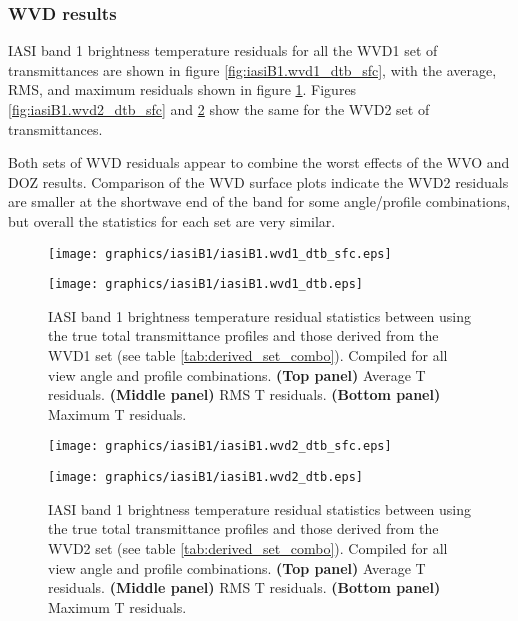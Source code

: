 \subsubsection{WVD results}
IASI band 1 brightness temperature residuals for all the WVD1 set of transmittances are shown in figure \ref{fig:iasiB1.wvd1_dtb_sfc}, with the average, RMS, and maximum residuals shown in figure \ref{fig:iasiB1.wvd1_dtb}. Figures \ref{fig:iasiB1.wvd2_dtb_sfc} and \ref{fig:iasiB1.wvd2_dtb} show the same for the WVD2 set of transmittances.

Both sets of WVD residuals appear to combine the worst effects of the WVO and DOZ results. Comparison of the WVD surface plots indicate the WVD2 residuals are smaller at the shortwave end of the band for some angle/profile combinations, but overall the statistics for each set are very similar.
\begin{figure}[htp]
  \centering
  \texttt{[image: graphics/iasiB1/iasiB1.wvd1\_dtb\_sfc.eps]}
  \caption{IASI band 1 brightness temperature residuals for all view angles and profiles between using the true total transmittance profiles and those derived from the WVD1 set (see table \ref{tab:derived_set_combo})}
  \label{fig:iasiB1.wvd1_dtb_sfc}
  \vspace{1em}
  \texttt{[image: graphics/iasiB1/iasiB1.wvd1\_dtb.eps]}
  \caption{IASI band 1 brightness temperature residual statistics between using the true total transmittance profiles and those derived from the WVD1 set (see table \ref{tab:derived_set_combo}). Compiled for all view angle and profile combinations. \textbf{(Top panel)} Average T residuals. \textbf{(Middle panel)} RMS T residuals. \textbf{(Bottom panel)} Maximum T residuals.}
  \label{fig:iasiB1.wvd1_dtb}
\end{figure}
\begin{figure}[htp]
  \centering
  \texttt{[image: graphics/iasiB1/iasiB1.wvd2\_dtb\_sfc.eps]}
  \caption{IASI band 1 brightness temperature residuals for all view angles and profiles between using the true total transmittance profiles and those derived from the WVD2 set (see table \ref{tab:derived_set_combo})}
  \label{fig:iasiB1.wvd2_dtb_sfc}
  \vspace{1em}
  \texttt{[image: graphics/iasiB1/iasiB1.wvd2\_dtb.eps]}
  \caption{IASI band 1 brightness temperature residual statistics between using the true total transmittance profiles and those derived from the WVD2 set (see table \ref{tab:derived_set_combo}). Compiled for all view angle and profile combinations. \textbf{(Top panel)} Average T residuals. \textbf{(Middle panel)} RMS T residuals. \textbf{(Bottom panel)} Maximum T residuals.}
  \label{fig:iasiB1.wvd2_dtb}
\end{figure}
